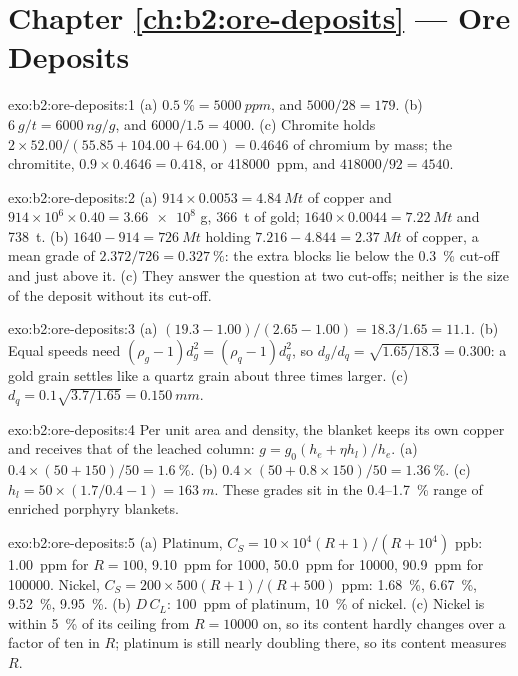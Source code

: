 \section*{Chapter \ref{ch:b2:ore-deposits} --- Ore Deposits}

\begin{solution}{exo:b2:ore-deposits:1}
(a) $\qty{0.5}{\percent} = \qty{5000}{ppm}$, and $5000/28 = 179$. (b) $\qty{6}{g/t} = \qty{6000}{ng/g}$,
and $6000/1.5 = 4000$. (c) Chromite holds $2 \times 52.00/(55.85 + 104.00 + 64.00) = 0.4646$ of
chromium by mass; the chromitite, $0.9 \times 0.4646 = 0.418$, or \qty{418000}{ppm}, and
$418000/92 = 4540$.
\end{solution}

\begin{solution}{exo:b2:ore-deposits:2}
(a) $914 \times 0.0053 = \qty{4.84}{Mt}$ of copper and $914 \times 10^6 \times 0.40 = \num{3.66e8}$ g,
\qty{366}{t} of gold; $1640 \times 0.0044 = \qty{7.22}{Mt}$ and \qty{738}{t}. (b) $1640 - 914 =
\qty{726}{Mt}$ holding $7.216 - 4.844 = \qty{2.37}{Mt}$ of copper, a mean grade of
$2.372/726 = \qty{0.327}{\percent}$: the extra blocks lie below the \qty{0.3}{\percent} cut-off
and just above it. (c) They answer the question at two cut-offs; neither is the size of the
deposit without its cut-off.
\end{solution}

\begin{solution}{exo:b2:ore-deposits:3}
(a) $(19.3 - 1.00)/(2.65 - 1.00) = 18.3/1.65 = 11.1$. (b) Equal speeds need $(\rho_g - 1)d_g^2 =
(\rho_q - 1)d_q^2$, so $d_g/d_q = \sqrt{1.65/18.3} = 0.300$: a gold grain settles like a quartz
grain about three times larger. (c) $d_q = 0.1\sqrt{3.7/1.65} = \qty{0.150}{mm}$.
\end{solution}

\begin{solution}{exo:b2:ore-deposits:4}
Per unit area and density, the blanket keeps its own copper and receives that of the leached
column: $g = g_0(h_e + \eta h_l)/h_e$. (a) $0.4 \times (50 + 150)/50 = \qty{1.6}{\percent}$.
(b) $0.4 \times (50 + 0.8 \times 150)/50 = \qty{1.36}{\percent}$. (c) $h_l = 50 \times (1.7/0.4 - 1)
= \qty{163}{m}$. These grades sit in the 0.4--\qty{1.7}{\percent} range of enriched porphyry
blankets.
\end{solution}

\begin{solution}{exo:b2:ore-deposits:5}
(a) Platinum, $C_S = 10 \times 10^4 (R + 1)/(R + 10^4)$ ppb: \qty{1.00}{ppm} for $R = 100$,
\qty{9.10}{ppm} for \num{1000}, \qty{50.0}{ppm} for \num{10000}, \qty{90.9}{ppm} for \num{100000}.
Nickel, $C_S = 200 \times 500 (R + 1)/(R + 500)$ ppm: \qty{1.68}{\percent}, \qty{6.67}{\percent},
\qty{9.52}{\percent}, \qty{9.95}{\percent}. (b) $D\,C_L$: \qty{100}{ppm} of platinum,
\qty{10}{\percent} of nickel. (c) Nickel is within \qty{5}{\percent} of its ceiling from
$R = \num{10000}$ on, so its content hardly changes over a factor of ten in $R$; platinum is still
nearly doubling there, so its content measures $R$.
\end{solution}

